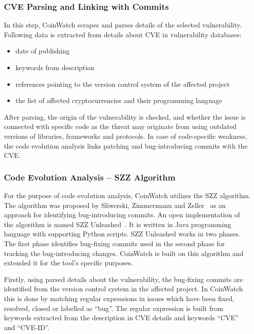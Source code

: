     \subsubsection*{CVE Parsing and Linking with Commits}
      In this step, CoinWatch scrapes and parses details of the selected vulnerability. Following data
      is extracted from details about CVE in vulnerability databases:
      \begin{itemize}
          \item date of publishing
          \item keywords from description
          \item references pointing to the version control system of the affected project
          \item the list of affected cryptocurrencies and their programming language
      \end{itemize}
      After parsing, the origin of the vulnerability is checked, and whether the issue is connected with specific
      code as the threat may originate from using outdated versions of libraries, frameworks and protocols.
      In case of code-specific weakness, the code evolution analysis links patching and bug-introducing
      commits with the CVE.

    \subsubsection*{Code Evolution Analysis -- SZZ Algorithm}
    For the purpose of code evolution analysis, CoinWatch utilizes the SZZ algorithm. The algorithm was proposed
    by Sliwerski, Zimmermann and Zeller~\cite{SZZalgorithm} as an approach for identifying bug-introducing
    commits. An open implementation of the algorithm is named SZZ Unleashed~\cite{SZZunleashed}. It is written
    in Java programming language with supporting Python scripts. SZZ Unleashed works in two phases. The first
    phase identifies bug-fixing commits used in the second phase for tracking the bug-introducing changes.
    CoinWatch is built on this algorithm and extended it for the tool's specific purposes.

    Firstly, using parsed details about the vulnerability, the bug-fixing commits are identified from
    the version control system in the affected project. In CoinWatch this is done by matching regular expressions
    in issues which have been fixed, resolved, closed or labelled as ``bug''. The regular expression is built
    from keywords extracted from the description in CVE details and keywords ``CVE'' and ``CVE-ID''.

